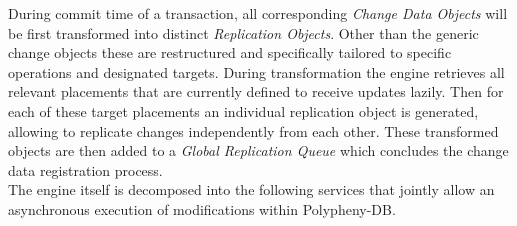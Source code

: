 During commit time of a transaction, all corresponding \emph{Change Data Objects} will be first transformed into distinct \emph{Replication Objects}. Other than
the generic change objects these are restructured and specifically tailored to specific operations and designated targets. During transformation the engine retrieves all 
relevant placements that are currently defined to receive updates lazily. Then for each of these target placements an individual replication object is generated, allowing to 
replicate changes independently from each other. These transformed objects are then added to a \emph{Global Replication Queue} which concludes the change data registration process.\\


The engine itself is decomposed into the following services that jointly allow an asynchronous execution of modifications within Polypheny-DB. 


